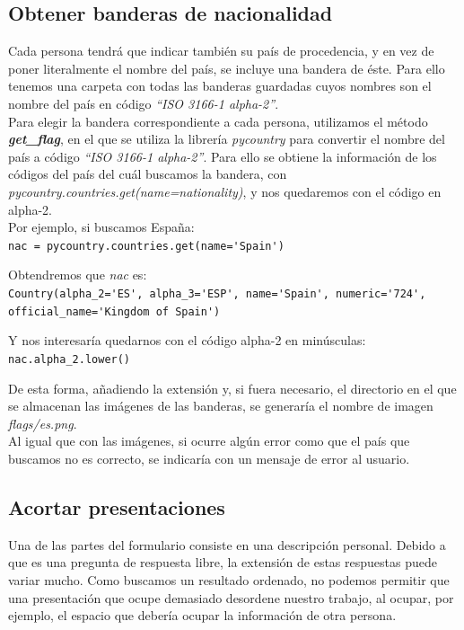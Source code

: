 \documentclass[a4paper, 12pt]{book}
\begin{document}
\subsection{Obtener banderas de nacionalidad}
\label{subsec:banderas}
Cada persona tendrá que indicar también su país de procedencia, y en vez de poner literalmente el nombre del país, se incluye una bandera de éste. Para ello tenemos una carpeta con todas las banderas guardadas cuyos nombres son el nombre del país en código \textit{``ISO 3166-1 alpha-2''}.\\

Para elegir la bandera correspondiente a cada persona, utilizamos el método \textbf{\textit{get\_flag}}, en el que se utiliza la librería \textit{pycountry} para convertir el nombre del país a código \textit{``ISO 3166-1 alpha-2''}. Para ello se obtiene la información de los códigos del país del cuál buscamos la bandera, con \textit{pycountry.countries.get(name=nationality)}, y nos quedaremos con el código en alpha-2.\\

Por ejemplo, si buscamos España:\\
\verb"nac = pycountry.countries.get(name='Spain')"

Obtendremos que \textit{nac} es:\\
\verb"Country(alpha_2='ES', alpha_3='ESP', name='Spain', numeric='724'," 
\verb"        official_name='Kingdom of Spain')"

Y nos interesaría quedarnos con el código alpha-2 en minúsculas:\\
\verb"nac.alpha_2.lower()"

De esta forma, añadiendo la extensión y, si fuera necesario, el directorio en el que se almacenan las imágenes de las banderas, se generaría el nombre de imagen \textit{flags/es.png}.\\

Al igual que con las imágenes, si ocurre algún error como que el país que buscamos no es correcto, se indicaría con un mensaje de error al usuario.

\subsection{Acortar presentaciones}
\label{subsec:presentacion}
Una de las partes del formulario consiste en una descripción personal. Debido a que es una pregunta de respuesta libre, la extensión de estas respuestas puede variar mucho. Como buscamos un resultado ordenado, no podemos permitir que una presentación que ocupe demasiado desordene nuestro trabajo, al ocupar, por ejemplo, el espacio que debería ocupar la información de otra persona.\\
\end{document}
